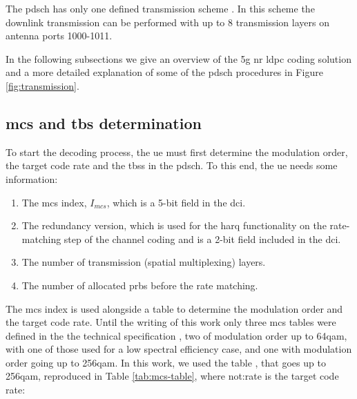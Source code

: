 The \gls{pdsch} has only one defined transmission scheme \cite{3gpp.38.214}.
%
In this scheme the downlink transmission can be performed with up to 8 transmission layers on antenna ports 1000-1011.
%


In the following subsections we give an overview of the \gls{5g} \gls{nr} \gls{ldpc} coding solution and a more detailed explanation of some of the \gls{pdsch} procedures in Figure \ref{fig:transmission}.




\subsection{\Acl{mcs} and \acl{tbs} determination}

To start the decoding process, the \gls{ue} must first determine the modulation order, the target code rate and the \glspl{tbs} in the \gls{pdsch}.
%
To this end, the \gls{ue} needs some information:

\begin{enumerate}
    \item The \gls{mcs} index, $I_{mcs}$, which is a 5-bit field in the \gls{dci}.
    \item The redundancy version, which is used for the \gls{harq} functionality on the rate-matching step of the channel coding and is a 2-bit field included in the \gls{dci}.
    \item The number of transmission (spatial multiplexing) layers.
    \item The number of allocated \glspl{prb} before the rate matching.
\end{enumerate}

The \gls{mcs} index is used alongside a table to determine the modulation order and the target code rate.
%
Until the writing of this work only three \gls{mcs} tables were defined in the the technical specification \cite{3gpp.38.214}, two of modulation order up to 64\gls{qam}, with one of those used for a low spectral efficiency case, and one with modulation order going up to 256\gls{qam}.
%
In this work, we used the table \cite[Table 5.1.3.1-2]{3gpp.38.214}, that goes up to 256\gls{qam}, reproduced in Table \ref{tab:mcs-table}, where \gls{not:rate} is the target code rate:

